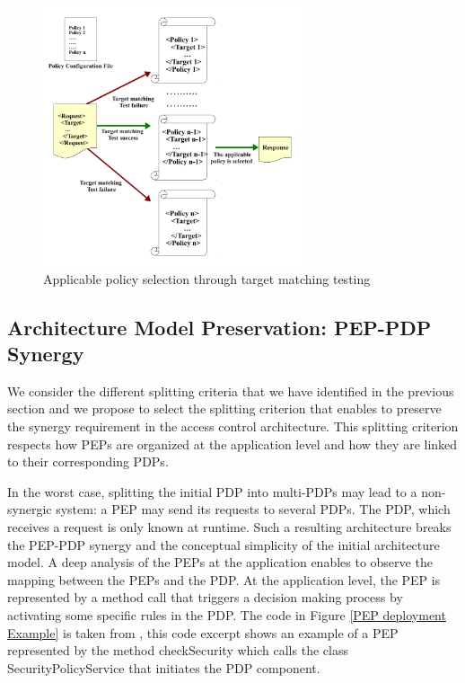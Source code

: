 \begin{figure}[!h]
\begin{center}
\includegraphics[width=3in, height=3in]{requestevaluation}
\caption{Applicable policy selection through target matching testing}
\label{requestevaluation}
\end{center}
\end{figure}



\subsection{Architecture Model Preservation: PEP-PDP Synergy}
We consider the different splitting criteria that we have identified in the previous section and we propose to select the splitting criterion that 
enables to preserve the synergy requirement in the access control architecture. This splitting criterion respects how PEPs are organized 
at the application level and how they are linked to their corresponding PDPs.

In the worst case, splitting the initial PDP into multi-PDPs may lead to a non-synergic system: a PEP may send its requests to several PDPs. 
The PDP, which receives a request is only known at runtime. Such a resulting architecture breaks the PEP-PDP synergy and the conceptual 
simplicity of the initial architecture model. 
A deep analysis of the PEPs at the application enables to observe the mapping between the PEPs and the PDP. At the application level, the PEP
is represented by a method call that triggers a decision making process by activating some specific rules in the PDP.
The code in Figure \ref{PEP deployment Example} is taken from \cite{legacy}, this code excerpt shows an example of a PEP represented by the method checkSecurity which calls the class 
SecurityPolicyService that initiates the PDP component.


